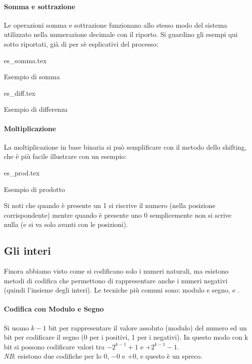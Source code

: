 \documentclass[class=book, crop=false, oneside]{standalone}
\begin{document}
\paragraph*{Somma e sottrazione}
Le operazioni somma e sottrazione funzionano allo stesso modo del sistema utilizzato nella numerazione decimale con il riporto. Si guardino gli esempi qui sotto riportati, già di per sè esplicativi del processo:
\vspace{10px}

\begin{table}[h!]
	\centering
	{es_somma.tex}
	\caption{Esempio di somma}
\end{table}
\begin{table}[h!]
	\centering
	{es_diff.tex}
	\caption{Esempio di differenza}
\end{table}

\paragraph*{Moltiplicazione}
La moltiplicazione in base binaria si può semplificare con il metodo dello shifting, che è più facile illustrare con un esempio:
\begin{table}[H]
	\centering
	{es_prod.tex}
	\caption{Esempio di prodotto}
\end{table}
Si noti che quando è presente un 1 si riscrive il numero (nella posizione corrispondente) mentre  quando è presente uno 0 semplicemente non si scrive nulla (e si va solo avanti con le posizioni).

\subsection{Gli interi}
Finora abbiamo visto come si codificano solo i numeri naturali, ma esistono metodi di codifica che permettono di rappresentare anche i numeri negativi (quindi l’insieme degli interi). Le tecniche più comuni sono: modulo e segno,  e .

\paragraph*{Codifica con Modulo e Segno}
Si usano \(k-1\) bit per rappresentare il valore assoluto (modulo) del numero  ed un bit per codificare il segno (0 per i positivi, 1 per i negativi). In questo modo con k bit si possono codificare valori tra \(-2^{k-1}+1\) e \(+2^{k-1}-1\).\\
\emph{NB}: esistono due codifiche per lo \(0\), \(-0\) e \(+0\), e questo è un spreco.
\end{document}
